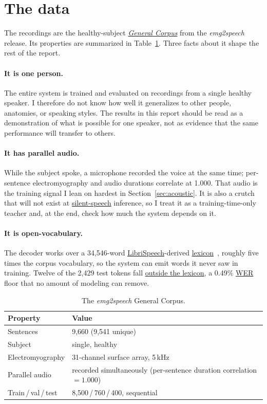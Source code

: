 \documentclass{article}
\DeclareRobustCommand{\glref}[2]{\hyperlink{gl:#1}{\textcolor{glosslink}{#2}}}
\DeclareRobustCommand{\wer}{\glref{wer}{WER}}
\begin{document}
\section{The data}
\label{sec:data}

The recordings are the healthy-subject \emph{\glref{corpus}{General Corpus}} from the
\emph{emg2speech} release. Its properties are summarized in Table~\ref{tab:data}. Three facts about
it shape the rest of the report.

\paragraph{It is one person.}
The entire system is trained and evaluated on recordings from a single healthy speaker. I therefore
do not know how well it generalizes to other people, anatomies, or speaking styles. The results in
this report should be read as a demonstration of what is possible for one speaker, not as evidence
that the same performance will transfer to others.

\paragraph{It has parallel audio.}
While the subject spoke, a microphone recorded the voice at the same time; per-sentence
electromyography and audio durations correlate at 1.000. That audio is the training signal I lean on
hardest in Section~\ref{sec:acoustic}. It is also a crutch that will not exist at
\glref{silent}{silent-speech} inference, so I treat it as a training-time-only teacher and, at the
end, check how much the system depends on it.

\paragraph{It is open-vocabulary.}
The decoder works over a 34{,}546-word \glref{librispeech}{LibriSpeech}-derived
\glref{lexicon}{lexicon}~\citep{panayotov2015librispeech}, roughly five times the corpus vocabulary,
so the system can emit words it never saw in training. Twelve of the 2{,}429 test tokens fall
\glref{oov}{outside the lexicon}, a 0.49\% \wer{} floor that no amount of modeling can remove.

\begin{table}[t]
\centering
\small
\caption{The \emph{emg2speech} General Corpus.}
\label{tab:data}
\begin{tabular}{@{}l p{8.6cm}@{}}
\toprule
Property & Value \\
\midrule
Sentences & 9{,}660 (9{,}541 unique) \\
Subject & single, healthy \\
Electromyography & 31-channel surface array, 5\,kHz \\
Parallel audio & recorded simultaneously (per-sentence duration correlation $=1.000$) \\
Train\,/\,val\,/\,test & 8{,}500\,/\,760\,/\,400, sequential \\
\bottomrule
\end{tabular}
\end{table}
\end{document}
